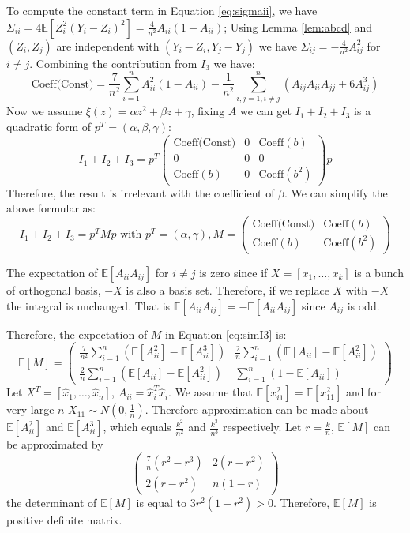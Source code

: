 \documentclass{article}
\def\E{\mathbb{E}}
\begin{document}
To compute the constant term in Equation \eqref{eq:sigmaii}, we have $\Sigma_{ii} = 4\E[Z_i^2 (Y_i-Z_i)^2] = \frac{4}{n^2} A_{ii}(1-A_{ii})$;
Using Lemma \ref{lem:abcd} and $(Z_i, Z_j)$ are independent with $(Y_i - Z_i, Y_j - Y_j)$ we have $\Sigma_{ij} = -\frac{4}{n^2} A_{ij}^2$ for $i \neq j$. Combining the contribution from $I_3$ we have:
\begin{equation}
\textrm{Coeff(Const)} = \frac{7}{n^2} \sum_{i=1}^n A^2_{ii} (1 -A_{ii}) - \frac{1}{n^2} \sum_{i,j=1,i\neq j}^n (A_{ij}A_{ii}A_{jj} + 6 A_{ij}^3)
\end{equation}
Now we assume $\xi(z) = \alpha z^2 + \beta z + \gamma$, fixing $A$ we can get $I_1 + I_2 + I_3$ is a quadratic form of $p^T = (\alpha, \beta, \gamma)$:
$$
I_1 + I_2 + I_3 =p^T \begin{pmatrix} 
\textrm{Coeff(Const)}  & 0 & \textrm{Coeff}(b) \\ 
0  & 0 & 0 \\ 
\textrm{Coeff}(b)   & 0 & \textrm{Coeff}(b^2) 
\end{pmatrix} p
$$
Therefore, the result is irrelevant with the coefficient of $\beta$.  We can simplify the above formular as:
\begin{equation}\label{eq:simI3}
I_1+I_2+I_3 = p^T M p \textrm{ with } p^T = (\alpha, \gamma), M = \begin{pmatrix} \textrm{Coeff(Const)}  &  \textrm{Coeff}(b) \\ \textrm{Coeff}(b) &  \textrm{Coeff}(b^2)  \end{pmatrix}
\end{equation}

The expectation of $\E[A_{ii} A_{ij}]$ for $i \neq j $ is zero since if $X= [x_1, \dots, x_k]$ is a bunch of orthogonal basis, $-X$ is also a basis set. Therefore, if we replace $X$ with $-X$ the integral is unchanged. That is $\E[A_{ii} A_{ij}] = -\E[A_{ii}A_{ij}]$ since $A_{ij}$ is odd. 

Therefore, the expectation of $M$ in Equation \ref{eq:simI3} is:
\begin{equation}
\E[M] = \begin{pmatrix} \frac{7}{n^2} \sum_{i=1}^n (\E[A_{ii}^2 ]-\E[A_{ii}^3]) & \frac{2}{n} \sum_{i=1}^n (\E[A_{ii}]-\E[A^2_{ii}]) \\
\frac{2}{n} \sum_{i=1}^n (\E[A_{ii}]-\E[A^2_{ii}]) & \sum_{i=1}^n (1-\E[A_{ii}])
 \end{pmatrix}
\end{equation}
Let $X^T=[\hat{x}_1, \dots, \hat{x}_n]$, $A_{ii}= \hat{x}_i^T \hat{x}_i$. We assume that $\E[x_{i1}^2] = \E[x_{11}^2]$ and for very large $n$ $X_{11} \sim N(0,\frac{1}{n})$. Therefore
approximation can be made about $\E[A_{ii}^2]$ and 
$\E[A_{ii}^3]$, which equals $\frac{k^2}{n^2}$ and $\frac{k^3}{n^3}$ respectively. Let $ r = \frac{k}{n}$, 
$\E[M] $ can be approximated by 
$$
\begin{pmatrix}
\frac{7}{n}(r^2 - r^3) & 2(r-r^2) \\
2(r-r^2) & n(1-r)
\end{pmatrix}
$$
the determinant of $\E[M]$ is equal to $3r^2(1-r^2) > 0 $. Therefore, $\E[M]$ is positive definite matrix.
\end{document}

